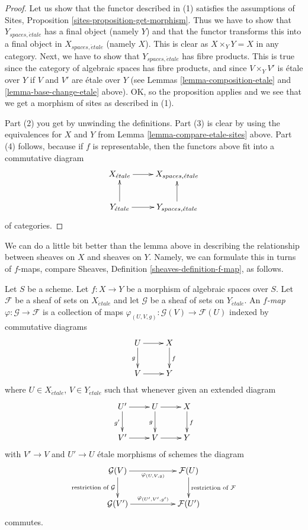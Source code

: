 \begin{proof}
Let us show that the functor described in (1) satisfies the assumptions
of Sites, Proposition \ref{sites-proposition-get-morphism}.
Thus we have to show that
$Y_{spaces, \acute{e}tale}$ has a final object (namely $Y$) and that
the functor transforms this into a final object in $X_{spaces, \acute{e}tale}$
(namely $X$). This is clear as $X \times_Y Y = X$ in any category.
Next, we have to show that $Y_{spaces, \acute{e}tale}$ has fibre products.
This is true since the category of algebraic spaces has fibre products,
and since $V \times_Y V'$ is \'etale over $Y$ if $V$ and $V'$ are \'etale
over $Y$ (see Lemmas \ref{lemma-composition-etale} and
\ref{lemma-base-change-etale} above).
OK, so the proposition applies and we see that we get a morphism
of sites as described in (1).

\medskip\noindent
Part (2) you get by unwinding the definitions.
Part (3) is clear by using the equivalences for $X$ and $Y$
from Lemma \ref{lemma-compare-etale-sites} above.
Part (4) follows, because if $f$ is representable, then the
functors above fit into a commutative diagram
$$
\xymatrix{
X_{\acute{e}tale} \ar[r] &
X_{spaces, \acute{e}tale} \\
Y_{\acute{e}tale} \ar[r] \ar[u] &
Y_{spaces, \acute{e}tale} \ar[u]
}
$$
of categories.
\end{proof}

\noindent
We can do a little bit better than the lemma above in describing
the relationship between sheaves on $X$ and sheaves on $Y$.
Namely, we can formulate this in turns of $f$-maps, compare
Sheaves, Definition \ref{sheaves-definition-f-map}, as follows.

\begin{definition}
\label{definition-f-map}
Let $S$ be a scheme.
Let $f : X \to Y$ be a morphism of algebraic spaces over $S$.
Let $\mathcal{F}$ be a sheaf of sets on $X_{\acute{e}tale}$ and
let $\mathcal{G}$ be a sheaf of sets on $Y_{\acute{e}tale}$.
An {\it $f$-map $\varphi : \mathcal{G} \to \mathcal{F}$}
is a collection of maps
$\varphi_{(U, V, g)} : \mathcal{G}(V) \to \mathcal{F}(U)$
indexed by commutative diagrams
$$
\xymatrix{
U \ar[d]_g \ar[r] & X \ar[d]^f \\
V \ar[r] & Y
}
$$
where $U \in X_{\acute{e}tale}$, $V \in Y_{\acute{e}tale}$ such that whenever
given an extended diagram
$$
\xymatrix{
U' \ar[r] \ar[d]_{g'} & U \ar[d]_g \ar[r] & X \ar[d]^f \\
V' \ar[r] & V \ar[r] & Y
}
$$
with $V' \to V$ and $U' \to U$ \'etale morphisms of schemes the diagram
$$
\xymatrix{
\mathcal{G}(V)
\ar[rr]_{\varphi_{(U, V, g)}}
\ar[d]_{\text{restriction of }\mathcal{G}} & &
\mathcal{F}(U)
\ar[d]^{\text{restriction of }\mathcal{F}} \\
\mathcal{G}(V')
\ar[rr]^{\varphi_{(U', V', g')}} & &
\mathcal{F}(U')
}
$$
commutes.
\end{definition}

